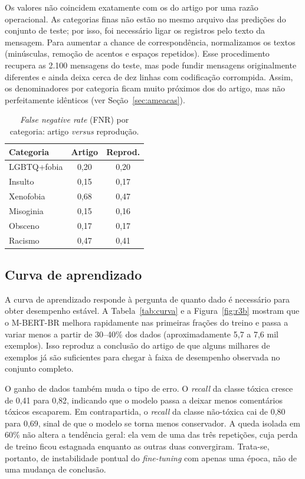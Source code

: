 \documentclass[sigconf, nonacm]{acmart}
\begin{document}
Os valores não coincidem exatamente com os do artigo por uma razão
operacional. As categorias finas não estão no mesmo arquivo das predições do
conjunto de teste; por isso, foi necessário ligar os registros pelo texto da
mensagem. Para aumentar a chance de correspondência, normalizamos os textos
(minúsculas, remoção de acentos e espaços repetidos). Esse procedimento
recupera as 2.100 mensagens do teste, mas pode fundir mensagens originalmente
diferentes e ainda deixa cerca de dez linhas com codificação corrompida.
Assim, os denominadores por categoria ficam muito próximos dos do artigo,
mas não perfeitamente idênticos (ver Seção~\ref{sec:ameacas}).

 
\begin{table}[t]
  \caption{\emph{False negative rate} (FNR) por categoria: artigo \emph{versus} reprodução.}
  \label{tab:fnrate}
  \small
  \begin{tabular}{@{}lcc@{}}
    \toprule
    \textbf{Categoria} & \textbf{Artigo} & \textbf{Reprod.} \\
    \midrule
    LGBTQ+fobia & 0,20 & 0,20 \\
    Insulto     & 0,15 & 0,17 \\
    Xenofobia   & 0,68 & 0,47 \\
    Misoginia   & 0,15 & 0,16 \\
    Obsceno     & 0,17 & 0,17 \\
    Racismo     & 0,47 & 0,41 \\
    \bottomrule
  \end{tabular}
\end{table}
 
\subsection{Curva de aprendizado}
\label{sec:res-curva}
 
A curva de aprendizado responde à pergunta de quanto dado é necessário para
obter desempenho estável. A Tabela~\ref{tab:curva} e a
Figura~\ref{fig:r3b} mostram que o M-BERT-BR melhora rapidamente nas
primeiras frações do treino e passa a variar menos a partir de 30--40\% dos
dados (aproximadamente 5,7 a 7,6 mil exemplos). Isso reproduz a conclusão do
artigo de que alguns milhares de exemplos já são suficientes para chegar à
faixa de desempenho observada no conjunto completo.

O ganho de dados também muda o tipo de erro. O \emph{recall} da classe
tóxica cresce de 0,41 para 0,82, indicando que o modelo passa a deixar menos
comentários tóxicos escaparem. Em contrapartida, o \emph{recall} da classe
não-tóxica cai de 0,80 para 0,69, sinal de que o modelo se torna menos
conservador. A queda isolada em 60\% não altera a tendência geral: ela vem
de uma das três repetições, cuja perda de treino ficou estagnada enquanto as
outras duas convergiram. Trata-se, portanto, de instabilidade pontual do
\emph{fine-tuning} com apenas uma época, não de uma mudança de conclusão.
 
\end{document}
